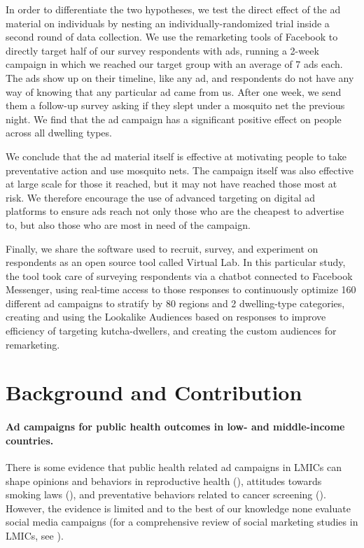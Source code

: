 \documentclass[a4paper,12pt]{article}
\begin{document}
In order to differentiate the two hypotheses, we test the direct effect of the ad material on individuals by nesting an individually-randomized trial inside a second round of data collection. We use the remarketing tools of Facebook to directly target half of our survey respondents with ads, running a 2-week campaign in which we reached our target group with an average of 7 ads each. The ads show up on their timeline, like any ad, and respondents do not have any way of knowing that any particular ad came from us. After one week, we send them a follow-up survey asking if they slept under a mosquito net the previous night. We find that the ad campaign has a significant positive effect on people across all dwelling types.

We conclude that the ad material itself is effective at motivating people to take preventative action and use mosquito nets. The campaign itself was also effective at large scale for those it reached, but it may not have reached those most at risk. We therefore encourage the use of advanced targeting on digital ad platforms to ensure ads reach not only those who are the cheapest to advertise to, but also those who are most in need of the campaign.

Finally, we share the software used to recruit, survey, and experiment on respondents as an open source tool called Virtual Lab. In this particular study, the tool took care of surveying respondents via a chatbot connected to Facebook Messenger, using real-time access to those responses to continuously optimize 160 different ad campaigns to stratify by 80 regions and 2 dwelling-type categories, creating and using the Lookalike Audiences based on responses to improve efficiency of targeting kutcha-dwellers, and creating the custom audiences for remarketing. 


\section{Background and Contribution}

\paragraph{Ad campaigns for public health outcomes in low- and middle-income countries.} There is some evidence that public health related ad campaigns in LMICs can shape opinions and behaviors in reproductive health (\cite{Agha2012}), attitudes towards smoking laws (\cite{Alday2010}), and preventative behaviors related to cancer screening (\cite{Wichachai2016}). However, the evidence is limited and to the best of our knowledge none evaluate social media campaigns (for a comprehensive review of social marketing studies in LMICs, see \cite{Schmidtke2021}).
\end{document}
